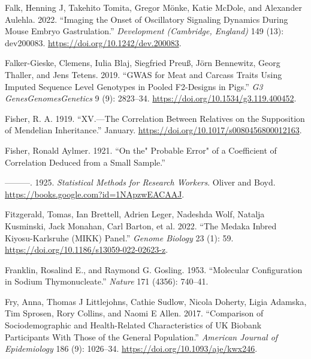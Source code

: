 \documentclass[
]{book}
\newlength{\cslhangindent}
\newlength{\cslentryspacingunit} %
\newenvironment{CSLReferences}[2] %
 {%
  \setlength{\parindent}{0pt}
  \ifodd #1
  \let\oldpar\par
  \def\par{\hangindent=\cslhangindent\oldpar}
  \fi
  \setlength{\parskip}{#2\cslentryspacingunit}
 }%
 {}
\begin{document}
\begin{CSLReferences}{1}{0}
\leavevmode{}%
Falk, Henning J, Takehito Tomita, Gregor Mönke, Katie McDole, and Alexander Aulehla. 2022. {``Imaging the Onset of Oscillatory Signaling Dynamics During Mouse Embryo Gastrulation.''} \emph{Development (Cambridge, England)} 149 (13): dev200083. \url{https://doi.org/10.1242/dev.200083}.

\leavevmode{}%
Falker-Gieske, Clemens, Iulia Blaj, Siegfried Preuß, Jörn Bennewitz, Georg Thaller, and Jens Tetens. 2019. {``{GWAS} for {Meat} and {Carcass Traits Using Imputed Sequence Level Genotypes} in {Pooled F2-Designs} in {Pigs}.''} \emph{G3 Genes\textbar Genomes\textbar Genetics} 9 (9): 2823--34. \url{https://doi.org/10.1534/g3.119.400452}.

\leavevmode{}%
Fisher, R. A. 1919. {``{XV}.---{The Correlation} Between {Relatives} on the {Supposition} of {Mendelian Inheritance}.''} January. \url{https://doi.org/10.1017/s0080456800012163}.

\leavevmode{}%
Fisher, Ronald Aylmer. 1921. {``On the{"} {Probable Error}{"} of a {Coefficient} of {Correlation Deduced} from a {Small Sample}.''}

\leavevmode{}%
---------. 1925. \emph{Statistical {Methods} for {Research Workers}}. {Oliver and Boyd}. \url{https://books.google.com?id=1NApzwEACAAJ}.

\leavevmode{}%
Fitzgerald, Tomas, Ian Brettell, Adrien Leger, Nadeshda Wolf, Natalja Kusminski, Jack Monahan, Carl Barton, et al. 2022. {``The {Medaka Inbred Kiyosu-Karlsruhe} ({MIKK}) Panel.''} \emph{Genome Biology} 23 (1): 59. \url{https://doi.org/10.1186/s13059-022-02623-z}.

\leavevmode{}%
Franklin, Rosalind E., and Raymond G. Gosling. 1953. {``Molecular Configuration in Sodium Thymonucleate.''} \emph{Nature} 171 (4356): 740--41.

\leavevmode{}%
Fry, Anna, Thomas J Littlejohns, Cathie Sudlow, Nicola Doherty, Ligia Adamska, Tim Sprosen, Rory Collins, and Naomi E Allen. 2017. {``Comparison of {Sociodemographic} and {Health-Related Characteristics} of {UK Biobank Participants With Those} of the {General Population}.''} \emph{American Journal of Epidemiology} 186 (9): 1026--34. \url{https://doi.org/10.1093/aje/kwx246}.


\end{CSLReferences}
\end{document}
